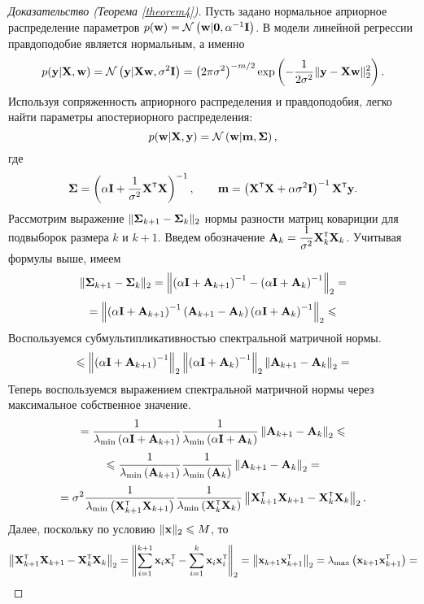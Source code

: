 \begin{proof}[Доказательство (Теорема \ref{theorem4})]
    Пусть задано нормальное априорное распределение параметров $p(\mathbf{w}) = \mathcal{N}\left( \mathbf{w} | \mathbf{0}, \alpha^{-1} \mathbf{I} \right)$. В модели линейной регрессии правдоподобие является нормальным, а именно
    \[ p(\mathbf{y} | \mathbf{X}, \mathbf{w}) = \mathcal{N}\left( \mathbf{y} | \mathbf{X} \mathbf{w}, \sigma^2 \mathbf{I} \right) = \left( 2\pi\sigma^2 \right)^{-m/2} \exp\left( -\dfrac{1}{2\sigma^2} \| \mathbf{y} - \mathbf{X} \mathbf{w} \|_2^2 \right). \]
    Используя сопряженность априорного распределения и правдоподобия, легко найти параметры апостериорного распределения:
    \[ p(\mathbf{w} | \mathbf{X}, \mathbf{y}) = \mathcal{N}\left( \mathbf{w} | \mathbf{m}, \boldsymbol{\Sigma} \right), \]
    где
    \[ \bSigma = \left( \alpha \bI + \dfrac{1}{\sigma^2} \bX\T \bX \right)^{-1}, \qquad \bm = \left( \bX\T \bX + \alpha \sigma^2 \bI \right)^{-1} \bX\T \by. \]
    Рассмотрим выражение $\| \boldsymbol{\Sigma}_{k+1} - \boldsymbol{\Sigma}_k \|_2$ нормы разности матриц ковариции для подвыборок размера $k$ и $k+1$. Введем обозначение $\bA_k = \dfrac{1}{\sigma^2} \bX\T_k \bX_k$. Учитывая формулы выше, имеем
    \[ \| \boldsymbol{\Sigma}_{k+1} - \boldsymbol{\Sigma}_k \|_2 = \left\| \left( \alpha \mathbf{I} + \mathbf{A}_{k+1} \right)^{-1} - \left( \alpha \mathbf{I} + \mathbf{A}_k \right)^{-1} \right\|_2 = \]
    \[ = \left\| \left( \alpha \mathbf{I} + \mathbf{A}_{k+1} \right)^{-1} \left( \mathbf{A}_{k+1} - \mathbf{A}_k \right) \left( \alpha \mathbf{I} + \mathbf{A}_k \right)^{-1} \right\|_2 \leqslant \]
    Воспользуемся субмультипликативностью спектральной матричной нормы.
    \[ \leqslant \left\| \left( \alpha \mathbf{I} + \mathbf{A}_{k+1} \right)^{-1} \right\|_2 \left\| \left( \alpha \mathbf{I} + \mathbf{A}_k \right)^{-1} \right\|_2 \left\| \mathbf{A}_{k+1} - \mathbf{A}_k \right\|_2 = \]
    Теперь воспользуемся выражением спектральной матричной нормы через максимальное собственное значение.
    \[ = \dfrac{1}{\lambda_{\min}\left( \alpha \mathbf{I} + \mathbf{A}_{k+1} \right)} \dfrac{1}{\lambda_{\min}\left( \alpha \mathbf{I} + \mathbf{A}_k \right)} \left\| \mathbf{A}_{k+1} - \mathbf{A}_k \right\|_2 \leqslant \]
    \[ \leqslant \dfrac{1}{\lambda_{\min}\left( \mathbf{A}_{k+1} \right)} \dfrac{1}{\lambda_{\min}\left( \mathbf{A}_k \right)} \left\| \mathbf{A}_{k+1} - \mathbf{A}_k \right\|_2 = \]
    \[ = \sigma^2  \dfrac{1}{\lambda_{\min}\left( \bX\T_{k+1} \bX_{k+1} \right)} \dfrac{1}{\lambda_{\min}\left( \bX\T_k \bX_k \right)} \left\| \bX\T_{k+1} \bX_{k+1} - \bX\T_k \bX_k \right\|_2. \]
    Далее, поскольку по условию $\| \mathbf{x} \|_2 \leqslant M$, то
    \[ \left\| \bX\T_{k+1} \bX_{k+1} - \bX\T_k \bX_k \right\|_2 = \left\| \sum\limits_{i=1}^{k+1} \bx_i \bx_i\T - \sum\limits_{i=1}^{k} \bx_i \bx_i\T \right\|_2 = \left\| \bx_{k+1} \bx_{k+1}\T \right\|_2 = \lambda_{\max}\left( \bx_{k+1} \bx_{k+1}\T \right) = \]

\end{proof}
